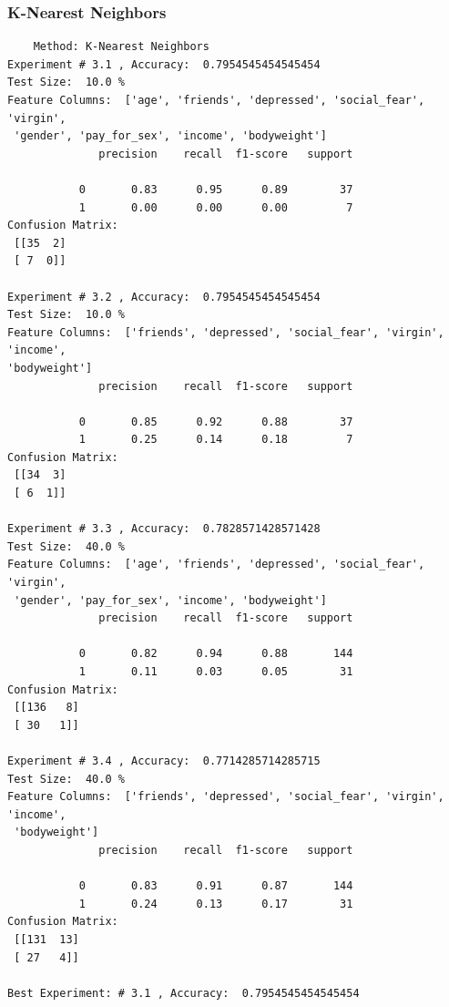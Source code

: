 \documentclass{article}
\begin{document}
\subsubsection{ K-Nearest Neighbors}
\begin{commandline}
	\begin{verbatim}
	Method: K-Nearest Neighbors
Experiment # 3.1 , Accuracy:  0.7954545454545454
Test Size:  10.0 %
Feature Columns:  ['age', 'friends', 'depressed', 'social_fear', 'virgin',
 'gender', 'pay_for_sex', 'income', 'bodyweight']
              precision    recall  f1-score   support

           0       0.83      0.95      0.89        37
           1       0.00      0.00      0.00         7
Confusion Matrix:
 [[35  2]
 [ 7  0]]

Experiment # 3.2 , Accuracy:  0.7954545454545454
Test Size:  10.0 %
Feature Columns:  ['friends', 'depressed', 'social_fear', 'virgin', 'income', 
'bodyweight']
              precision    recall  f1-score   support

           0       0.85      0.92      0.88        37
           1       0.25      0.14      0.18         7
Confusion Matrix:
 [[34  3]
 [ 6  1]]

Experiment # 3.3 , Accuracy:  0.7828571428571428
Test Size:  40.0 %
Feature Columns:  ['age', 'friends', 'depressed', 'social_fear', 'virgin',
 'gender', 'pay_for_sex', 'income', 'bodyweight']
              precision    recall  f1-score   support

           0       0.82      0.94      0.88       144
           1       0.11      0.03      0.05        31
Confusion Matrix:
 [[136   8]
 [ 30   1]]

Experiment # 3.4 , Accuracy:  0.7714285714285715
Test Size:  40.0 %
Feature Columns:  ['friends', 'depressed', 'social_fear', 'virgin', 'income',
 'bodyweight']
              precision    recall  f1-score   support

           0       0.83      0.91      0.87       144
           1       0.24      0.13      0.17        31
Confusion Matrix:
 [[131  13]
 [ 27   4]]

Best Experiment: # 3.1 , Accuracy:  0.7954545454545454

	\end{verbatim}
\end{commandline}
\end{document}
